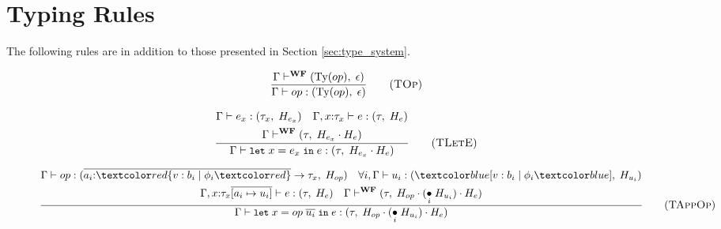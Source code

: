 \section{Typing Rules}\label{app:type-system}

The following rules are in addition to those presented in Section \ref{sec:type_system}.

\begin{figure}[ht]
    \centering
    \noindent
    \begin{minipage}{0.3\textwidth}
        \begin{equation}
            \frac{
                \Gamma \vdash^{\textbf{WF}} (\text{Ty}(op), \; \epsilon)
            }{
                \Gamma \vdash op : (\text{Ty}(op), \; \epsilon)
            }
            \tag{\textsc{TOp}}
        \end{equation}
    \end{minipage}
    \hfill
    \begin{minipage}{0.6\textwidth}
        \begin{equation}
            \frac{
                \begin{gathered}
                    \Gamma \vdash e_x : (\tau_x, \; H_{e_x}) \quad \Gamma, x{:}\tau_x \vdash e : (\tau, \; H_e) \\
                    \Gamma \vdash^{\textbf{WF}} (\tau, \; H_{e_x} \cdot H_e)
                \end{gathered}  
            }{
                \Gamma \vdash \texttt{\small{let}}\;x = e_x\;\texttt{\small{in}}\;e : (\tau, \; H_{e_x} \cdot H_e)
            }
            \tag{\textsc{TLetE}}
        \end{equation}
    \end{minipage}

    \vspace{20pt}

    \begin{equation}
        \frac{
            \begin{gathered}
                \Gamma \vdash op : (\overline{a_i{:}\overa{v: b_i \;|\; \phi_i}} \rightarrow \tau_x, \; H_{op} ) \quad \forall i, \Gamma \vdash u_i : (\under{v: b_i \;|\; \phi_i}, \; H_{u_i}) \\
                \Gamma, x{:}\tau_x\overline{[a_i \mapsto u_i]} \vdash e : (\tau, \; H_e) \quad \Gamma \vdash^{\textbf{WF}} (\tau, \; H_{op} \cdot ( \underset{i}{\bullet} \; H_{u_i} ) \cdot H_e)
            \end{gathered}
        }{
            \Gamma \vdash \texttt{\small{let}}\;x = op\;\overline{u_i}\;\texttt{\small{in}}\;e : (\tau, \; H_{op} \cdot ( \underset{i}{\bullet} \; H_{u_i} ) \cdot H_e)
        }
        \tag{\textsc{TAppOp}}
    \end{equation}


\end{figure}
